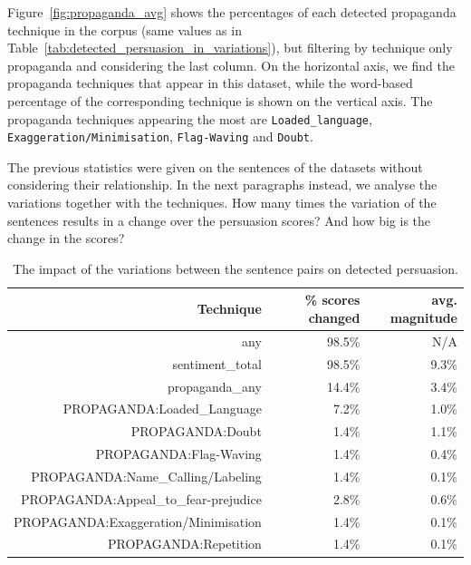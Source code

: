 Figure~\ref{fig:propaganda_avg} shows the percentages of each detected propaganda technique in the corpus (same values as in Table~\ref{tab:detected_persuasion_in_variations}), but filtering by technique only propaganda and considering the last column.
On the horizontal axis, we find the propaganda techniques that appear in this dataset, while the word-based percentage of the corresponding technique is shown on the vertical axis.
The propaganda techniques appearing the most are \texttt{Loaded\_language}, \texttt{Exaggeration/Minimisation}, \texttt{Flag-Waving} and \texttt{Doubt}.

The previous statistics were given on the sentences of the datasets without considering their relationship.
In the next paragraphs instead, we analyse the variations together with the techniques.
How many times the variation of the sentences results in a change over the persuasion scores? And how big is the change in the scores?

\begin{table}[!htbp]
    \centering
    \begin{tabular}{r|rr}
         Technique & \% scores changed & avg. magnitude \\
         \hline
         any & 98.5\% & N/A \\
        sentiment\_total & 98.5\% & 9.3\% \\
        propaganda\_any & 14.4\% & 3.4\% \\
        PROPAGANDA:Loaded\_Language & 7.2\% & 1.0\% \\
        PROPAGANDA:Doubt & 1.4\% & 1.1\% \\
        PROPAGANDA:Flag-Waving & 1.4\% & 0.4\% \\
        PROPAGANDA:Name\_Calling/Labeling & 1.4\% & 0.1\% \\
        PROPAGANDA:Appeal\_to\_fear-prejudice & 2.8\% & 0.6\% \\
        PROPAGANDA:Exaggeration/Minimisation & 1.4\% & 0.1\% \\
        PROPAGANDA:Repetition & 1.4\% & 0.1\% \\
    \end{tabular}
    \caption{The impact of the variations between the sentence pairs on detected persuasion.}
    \label{tab:change_scores_persuasion_in_variations}
\end{table}

